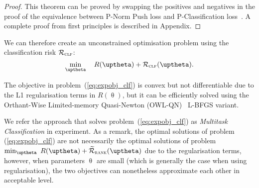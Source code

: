 \begin{proof}
This theorem can be proved by swapping the positives and negatives in the proof of 
the equivalence between P-Norm Push loss and P-Classification loss~\cite{ertekin2011equivalence}.
A complete proof from first principles is described in Appendix.
\end{proof}

We can therefore create an unconstrained optimisation problem using the classification risk $\mathcal{R}_\textsc{clf}$:
\begin{equation}
\label{eq:expobj_clf}
\min_\uptheta \quad R(\uptheta) + \RCal_\textsc{clf}(\uptheta).
\end{equation}

The objective in problem~(\ref{eq:expobj_clf}) is convex but not differentiable due to the L1 regularisation terms in $R(\uptheta)$,
but it can be efficiently solved using the Orthant-Wise Limited-memory Quasi-Newton (OWL-QN)~\cite{andrew2007scalable} L-BFGS variant.

We refer the approach that solves problem~(\ref{eq:expobj_clf}) as \emph{Multitask Classification} in experiment.
As a remark, the optimal solutions of problem (\ref{eq:expobj_clf}) are not necessarily the optimal solutions 
of problem $\min_\uptheta \ R(\uptheta) + \widetilde\RCal_\textsc{rank}(\uptheta)$ due to the regularisation terms,
however, when parameters $\uptheta$ are small (which is generally the case when using regularisation), the two objectives 
can nonetheless approximate each other in acceptable level.





%


